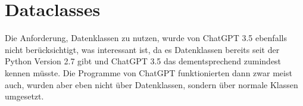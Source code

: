 \documentclass[class=scrbook, crop=false]{standalone}
\begin{document}
\section{Dataclasses}
\label{sec:dataclasses}
    Die Anforderung, Datenklassen zu nutzen, wurde von ChatGPT 3.5 ebenfalls nicht berücksichtigt, was interessant ist,
    da es Datenklassen bereits seit der Python Version 2.7 gibt und ChatGPT 3.5 das dementsprechend zumindest kennen müsste.
    Die Programme von ChatGPT funktionierten dann zwar meist auch, wurden aber eben nicht über Datenklassen, sondern
    über normale Klassen umgesetzt.
\end{document}
